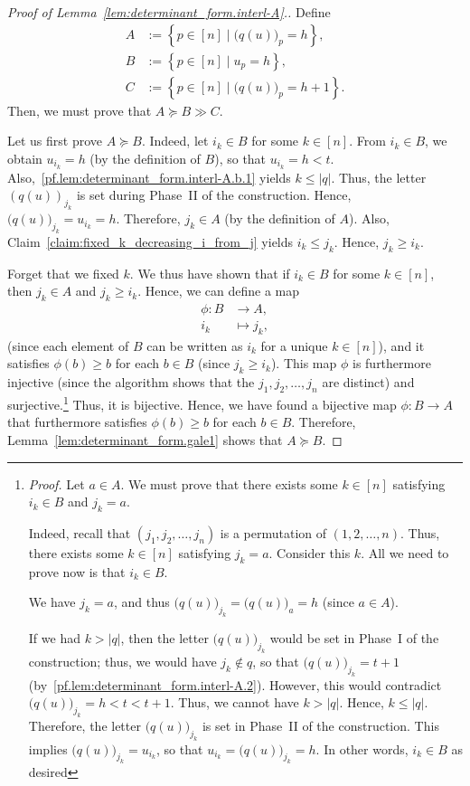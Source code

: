 \documentclass[reqno]{amsart}
\newcommand{\0}{\phantom{c}}
\newcommand{\set}[1]{\left\{ #1 \right\}}
\newcommand{\abs}[1]{\left| #1 \right|}
\newcommand{\tup}[1]{\left( #1 \right)}
\newcommand{\ive}[1]{\left[ #1 \right]}
\theoremstyle{plain}
\theoremstyle{definition}
\numberwithin{equation}{section}
\begin{document}
\begin{proof}[Proof of Lemma~\ref{lem:determinant_form.interl-A}.]
Define
\begin{align*}
A & := \set{ p\in \ive{n} \mid \bigl( q(u) \bigr)_p = h },
\\ B & := \set{ p\in \ive{n} \mid u_p = h },
\\ C & := \set{ p\in \ive{n} \mid \bigl( q(u) \bigr)_p = h+1 }.
\end{align*}
Then, we must prove that $A \succeq B \gg C$.

Let us first prove $A \succeq B$.
Indeed, let $i_k\in B$ for some $k \in \ive{n}$.
From $i_k\in B$, we obtain $u_{i_k} = h$ (by the definition of $B$), so that $u_{i_k} = h < t$.
Also,~\eqref{pf.lem:determinant_form.interl-A.b.1} yields $k\leq \abs{q}$.
Thus, the letter $\left( q(u) \right) _{j_k}$ is set during Phase~II of the construction.
Hence, $\bigl( q(u) \bigr)_{j_k} = u_{i_k} = h$.
Therefore, $j_k\in A$ (by the definition of  $A$).
Also, Claim~\ref{claim:fixed_k_decreasing_i_from_j} yields $i_k\leq j_k$.
Hence, $j_k\geq i_k$.

Forget that we fixed $k$. We thus have shown that if $i_k\in B$ for some $k \in \ive{n} $, then $j_k\in A$ and $j_k\geq i_k$.
Hence, we can define a map
\begin{align*}
\phi \colon B & \to A, \\
i_k & \mapsto j_k,
\end{align*}
(since each element of $B$ can be written as $i_k$ for a unique $k\in \ive{n} $), and it satisfies $\phi(b) \geq b$ for each $b \in B$ (since $j_k \geq i_k$).
This map $\phi $ is furthermore injective (since the algorithm shows that the $j_1, j_2, \dotsc, j_n$ are distinct) and surjective.\footnote{\textit{Proof.}
  Let $a\in A$.
  We must prove that there exists some $k\in \ive{n}$ satisfying $i_k \in B$ and $j_k = a$.
  \par
  Indeed, recall that $\left( j_1,j_2,\ldots ,j_n\right) $ is a permutation of $\tup{1, 2, \dotsc, n}$.
  Thus, there exists some $k \in \ive{n} $ satisfying $j_k = a$.
  Consider this $k$.
  All we need to prove now is that $i_k\in B$.
  \par
  We have $j_k = a$, and thus $\bigl( q(u) \bigr)_{j_k} = \bigl( q(u) \bigr)_a = h$ (since $a \in A$).
  \par
  If we had $k > \abs{q}$, then the letter $\bigl( q(u) \bigr)_{j_k}$ would be set in Phase~I of the construction;
  thus, we would have $j_k\notin q$, so that $\bigl( q(u) \bigr)_{j_k}=t+1$ (by~\eqref{pf.lem:determinant_form.interl-A.2}).
  However, this would contradict $\bigl( q(u) \bigr)_{j_k} = h < t < t+1$.
  Thus, we cannot have $k > \abs{q}$.
  Hence, $k \leq \abs{q}$.
  Therefore, the letter $\bigl( q(u) \bigr)_{j_k}$ is set in Phase~II of the construction.
  This implies $\bigl( q(u) \bigr)_{j_k} = u_{i_k}$, so that $u_{i_k} = \bigl( q(u) \bigr)_{j_k} = h$.
  In other words, $i_k \in B$ as desired}
Thus, it is bijective. Hence, we have found a bijective
map $\phi \colon B \to A$ that furthermore satisfies $\phi(b) \geq b$ for each $b\in B$.
Therefore, Lemma~\ref{lem:determinant_form.gale1} shows that $A \succeq B$.


\end{proof}
\end{document}
